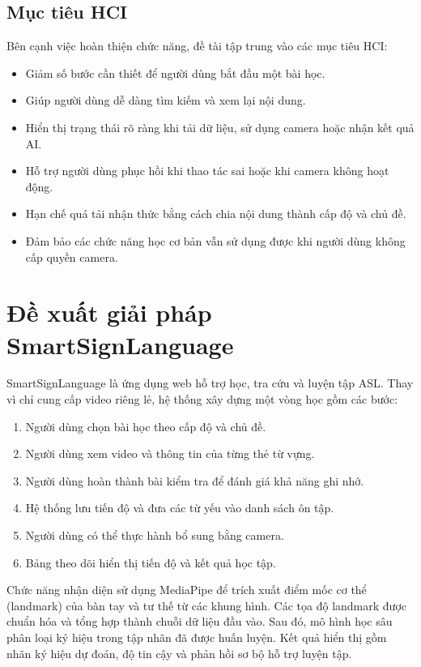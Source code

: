 \subsection{Mục tiêu HCI}

Bên cạnh việc hoàn thiện chức năng, đề tài tập trung vào các mục tiêu HCI:

\begin{itemize}
  \item Giảm số bước cần thiết để người dùng bắt đầu một bài học.
  \item Giúp người dùng dễ dàng tìm kiếm và xem lại nội dung.
  \item Hiển thị trạng thái rõ ràng khi tải dữ liệu, sử dụng camera hoặc nhận
        kết quả AI.
  \item Hỗ trợ người dùng phục hồi khi thao tác sai hoặc khi camera không hoạt
        động.
  \item Hạn chế quá tải nhận thức bằng cách chia nội dung thành cấp độ và chủ
        đề.
  \item Đảm bảo các chức năng học cơ bản vẫn sử dụng được khi người dùng không
        cấp quyền camera.
\end{itemize}

\section{Đề xuất giải pháp SmartSignLanguage}

SmartSignLanguage là ứng dụng web hỗ trợ học, tra cứu và luyện tập ASL. Thay vì
chỉ cung cấp video riêng lẻ, hệ thống xây dựng một vòng học gồm các bước:

\begin{enumerate}
  \item Người dùng chọn bài học theo cấp độ và chủ đề.
  \item Người dùng xem video và thông tin của từng thẻ từ vựng.
  \item Người dùng hoàn thành bài kiểm tra để đánh giá khả năng ghi nhớ.
  \item Hệ thống lưu tiến độ và đưa các từ yếu vào danh sách ôn tập.
  \item Người dùng có thể thực hành bổ sung bằng camera.
  \item Bảng theo dõi hiển thị tiến độ và kết quả học tập.
\end{enumerate}

Chức năng nhận diện sử dụng MediaPipe để trích xuất điểm mốc cơ thể (landmark)
của bàn tay và tư thế từ các khung hình. Các tọa độ landmark được chuẩn hóa và
tổng hợp thành chuỗi dữ liệu đầu vào. Sau đó, mô hình học sâu phân loại ký hiệu
trong tập nhãn đã được huấn luyện. Kết quả hiển thị gồm nhãn ký hiệu dự đoán, độ
tin cậy và phản hồi sơ bộ hỗ trợ luyện tập.

